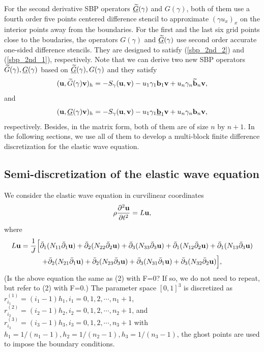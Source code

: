 \documentclass[a4paper]{article}
\newcommand{\wt}{\widetilde}
\begin{document}
For the second derivative SBP operators $\uline{\wt{G}}(\gamma)$ and $G(\gamma)$, both of them use a fourth order five points centered difference stencil to approximate $(\gamma u_x)_x$ on the interior points away from the boundaries. For the first and the last six grid points close to the boudaries, the operators $G(\gamma)$ and $\uline{\wt{G}}(\gamma)$ use second order accurate one-sided difference stencils. They are designed to satisfy (\ref{sbp_2nd_2}) and (\ref{sbp_2nd_1}), respectively.  Note that we can derive two new SBP operators $\wt{G}(\gamma), \uline{G}(\gamma)$ based on $\uline{\wt{G}}(\gamma), G(\gamma)$ and they satisfy
\begin{equation}\label{sbp_2nd_3}
({\bf u}, \wt{G}(\gamma){\bf v})_h = -S_\gamma({\bf u},{\bf v})-u_1\gamma_1{\bf b}_1{\bf v} + u_n\gamma_n\wt{{\bf b}}_n{\bf v},
\end{equation}
and
\begin{equation}\label{sbp_2nd_4}
({\bf u}, \uline{G}(\gamma){\bf v})_h = -S_\gamma({\bf u},{\bf v})-u_1\gamma_1\uline{{\bf b}}_1{\bf v} + u_n\gamma_n{\bf b}_n{\bf v},
\end{equation}
respectively. Besides, in the matrix form, both of them are of size $n$ by $n+1$. In the following sections, we use all of them to develop a multi-block finite difference discretization for the elastic wave equation. 

\subsection{Semi-discretization of the elastic wave equation}

We consider the elastic wave equation in curvilinear coordinates 
\begin{equation}\label{elastic_equation}
\rho\frac{\partial^2 {\bf u}}{\partial t^2} = L{\bf u},
\end{equation}
where 
\begin{multline}\label{spatial_operator}
L{\bf u} = \frac{1}{J}\Big[\bar{\partial}_1(N_{11}\bar{\partial}_1{\bf u}) + \bar{\partial}_2(N_{22}\bar{\partial}_2{\bf u}) + \bar{\partial}_3(N_{33}\bar{\partial}_3{\bf u}) + \bar{\partial}_1(N_{12}\bar{\partial}_2{\bf u}) + \bar{\partial}_1(N_{13}\bar{\partial}_3{\bf u}) \\
+ \bar{\partial}_2(N_{21}\bar{\partial}_1{\bf u}) + \bar{\partial}_2(N_{23}\bar{\partial}_3{\bf u}) +\bar{\partial}_3(N_{31}\bar{\partial}_1{\bf u}) + \bar{\partial}_3(N_{32}\bar{\partial}_2{\bf u})\Big],
\end{multline}
{\color{red}(Is the above equation the same as (2) with F=0? If so, we do not need to repeat, but refer to (2) with F=0.)} The parameter space $[0,1]^3$ is discretized as $r_{i_1}^{(1)} = (i_1-1)h_1, i_1 = 0,1,2,\cdots,n_1+1$, $r_{i_2}^{(2)} = (i_2-1)h_2, i_2 = 0,1,2,\cdots,n_2+1$, and $r_{i_3}^{(3)} = (i_3-1)h_3, i_3 = 0,1,2,\cdots,n_3+1$ with $h_1 = 1/(n_1-1), h_2 = 1/(n_2-1), h_3 = 1/(n_3-1)$, the ghost points are used to impose the boundary conditions.
\end{document}
